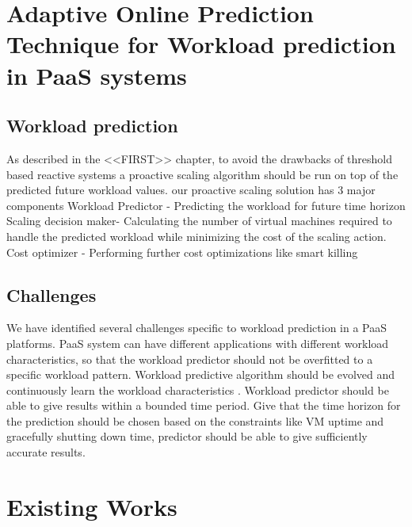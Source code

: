 \section{Adaptive Online Prediction Technique for Workload prediction in PaaS systems}


\subsection{Workload prediction }

As described in the <<FIRST>> chapter, to avoid the drawbacks of threshold based reactive systems a proactive scaling algorithm should be run on top of the predicted future workload values. our proactive scaling solution has 3 major components
Workload Predictor - Predicting the workload for future time horizon
Scaling decision maker- Calculating the number of virtual machines required to handle the predicted workload while minimizing the cost of the scaling action.
Cost optimizer - Performing further cost optimizations like smart killing

\subsection{Challenges}

We have identified several challenges specific to workload prediction in a PaaS platforms.
PaaS system can have different applications with different workload characteristics, so that the workload predictor should not be overfitted to a specific workload pattern.
Workload predictive algorithm should be evolved and continuously learn the workload characteristics . 
Workload predictor should be able to give results within a bounded time period.
Give that the  time horizon for the prediction should be chosen based on the constraints like VM uptime and gracefully shutting down time, predictor should be able to give sufficiently accurate results.

\section{Existing Works}


